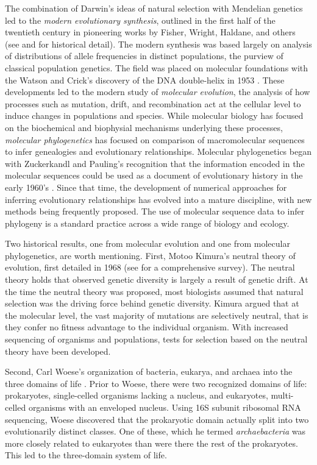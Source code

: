 The combination of Darwin's ideas of natural selection with Mendelian genetics led to the \emph{modern evolutionary synthesis}, outlined in the first half of the twentieth century in pioneering works by Fisher, Wright, Haldane, and others (see \cite{Huxley:1942} and \cite{Gould:2002ts} for historical detail).
The modern synthesis was based largely on analysis of distributions of allele frequencies in distinct populations, the purview of classical population genetics.
The field was placed on molecular foundations with the Watson and Crick's discovery of the DNA double-helix in 1953 \cite{Watson:1953wm}.
These developments led to the modern study of \emph{molecular evolution}, the analysis of how processes such as mutation, drift, and recombination act at the cellular level to induce changes in populations and species.
While molecular biology has focused on the biochemical and biophysial mechanisms underlying these processes, \emph{molecular phylogenetics} has focused on comparison of macromolecular sequences to infer genealogies and evolutionary relationships.
Molecular phylogenetics began with Zuckerkandl and Pauling's recognition that the information encoded in the molecular sequences could be used as a document of evolutionary history in the early 1960's \cite{Zuckerkandl:1962,Zuckerkandl:1965wi}.
Since that time, the development of numerical approaches for inferring evolutionary relationships has evolved into a mature discipline, with new methods being frequently proposed.
The use of molecular sequence data to infer phylogeny is a standard practice across a wide range of biology and ecology.

Two historical results, one from molecular evolution and one from molecular phylogenetics, are worth mentioning.
First, Motoo Kimura's neutral theory of evolution, first detailed in 1968 \cite{Kimura:1968vw} (see \cite{Kimura:1984} for a comprehensive survey).
The neutral theory holds that observed genetic diversity is largely a result of genetic drift.
At the time the neutral theory was proposed, most biologists assumed that natural selection was the driving force behind genetic diversity.
Kimura argued that at the molecular level, the vast majority of mutations are selectively neutral, that is they confer no fitness advantage to the individual organism.
With increased sequencing of organisms and populations, tests for selection based on the neutral theory have been developed.

Second, Carl Woese's organization of bacteria, eukarya, and archaea into the three domains of life \cite{Woese:1977vd}.
Prior to Woese, there were two recognized domains of life: prokaryotes, single-celled organisms lacking a nucleus, and eukaryotes, multi-celled organisms with an enveloped nucleus.
Using 16S subunit ribosomal RNA sequencing, Woese discovered that the prokaryotic domain actually split into two evolutionarily distinct classes.
One of these, which he termed \emph{archaebacteria} was more closely related to eukaryotes than were there the rest of the prokaryotes.
This led to the three-domain system of life.

